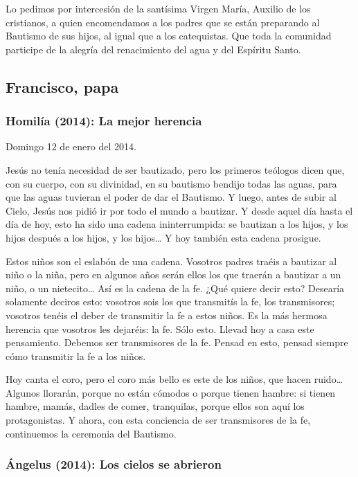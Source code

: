 {Lo pedimos por intercesión de la santísima Virgen María, Auxilio de los cristianos, a quien encomendamos a los padres que se están preparando al Bautismo de sus hijos, al igual que a los catequistas. Que toda la comunidad participe de la alegría del renacimiento del agua y del Espíritu Santo.

\subsection{Francisco, papa}

\subsubsection{Homilía (2014): La mejor herencia}

Domingo 12 de enero del 2014.

Jesús no tenía necesidad de ser bautizado, pero los primeros teólogos dicen que, con su cuerpo, con su divinidad, en su bautismo bendijo todas las aguas, para que las aguas tuvieran el poder de dar el Bautismo. Y luego, antes de subir al Cielo, Jesús nos pidió ir por todo el mundo a bautizar. Y desde aquel día hasta el día de hoy, esto ha sido una cadena ininterrumpida: se bautizan a los hijos, y los hijos después a los hijos, y los hijos\ldots{} Y hoy también esta cadena prosigue.

Estos niños son el eslabón de una cadena. Vosotros padres traéis a bautizar al niño o la niña, pero en algunos años serán ellos los que traerán a bautizar a un niño, o un nietecito\ldots{} Así es la cadena de la fe. ¿Qué quiere decir esto? Desearía solamente deciros esto: vosotros sois los que transmitís la fe, los transmisores; vosotros tenéis el deber de transmitir la fe a estos niños. Es la más hermosa herencia que vosotros les dejaréis: la fe. Sólo esto. Llevad hoy a casa este pensamiento. Debemos ser transmisores de la fe. Pensad en esto, pensad siempre cómo transmitir la fe a los niños.

Hoy canta el coro, pero el coro más bello es este de los niños, que hacen ruido\ldots{} Algunos llorarán, porque no están cómodos o porque tienen hambre: si tienen hambre, mamás, dadles de comer, tranquilas, porque ellos son aquí los protagonistas. Y ahora, con esta conciencia de ser transmisores de la fe, continuemos la ceremonia del Bautismo.

\subsubsection{Ángelus (2014): Los cielos se abrieron}

}
